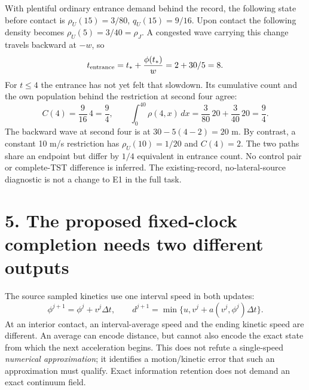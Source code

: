 \documentclass[11pt,a4paper]{article}
\begin{document}
With plentiful ordinary entrance demand behind the record, the following
state before contact is $\rho_U(15)=3/80$, $q_U(15)=9/16$. Upon contact the
following density becomes $\rho_U(5)=3/40=\rho_J$. A congested wave carrying
this change travels backward at $-w$, so
\begin{equation}
 t_{\rm entrance}=t_*+\frac{\phi(t_*)}{w}=2+30/5=8.
\end{equation}
For $t\le4$ the entrance has not yet felt that slowdown. Its cumulative
count and the own population behind the restriction at second four agree:
\begin{equation}
 C(4)=\frac9{16}\,4=\frac94,
 \qquad \int_0^{40}\rho(4,x)\,dx
 =\frac3{80}\,20+\frac3{40}\,20=\frac94.
\end{equation}
The backward wave at second four is at $30-5(4-2)=20$ m. By contrast, a
constant 10 m/s restriction has $\rho_U(10)=1/20$ and $C(4)=2$. The two
paths share an endpoint but differ by $1/4$ equivalent in entrance count.
No control pair or complete-TST difference is inferred. The existing-record,
no-lateral-source diagnostic is not a change to E1 in the full task.

\newpage
\section*{5. The proposed fixed-clock completion needs two different outputs}
The source sampled kinetics use one interval speed in both updates:
\begin{equation}
 \phi^{j+1}=\phi^j+v^j\Delta t,\qquad
 d^{j+1}=\min\{u,v^j+a(v^j,\phi^j)\Delta t\}.
\end{equation}
At an interior contact, an interval-average speed and the ending kinetic
speed are different. An average can encode distance, but cannot also encode
the exact state from which the next acceleration begins. This does not refute
a single-speed \emph{numerical approximation}; it identifies a motion/kinetic
error that such an approximation must qualify. Exact information retention
does not demand an exact continuum field.
\end{document}
